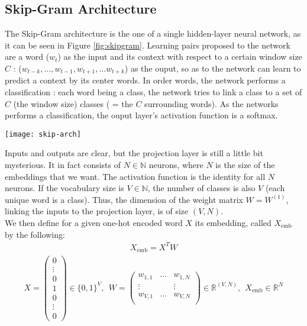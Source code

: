 \documentclass{article}
\newcommand{\N}{\mathbb N}
\newcommand{\R}{\mathbb R}
\begin{document}
\subsection{Skip-Gram Architecture}

The Skip-Gram architecture is the one of a single hidden-layer neural network, as it can be seen in Figure
\ref{fig:skipgram}. Learning pairs proposed to the network are a word ($w_t$) as the input and its context with respect
to a certain window size $C$ : ($w_{t-k}, ..., w_{t-1}, w_{t+1}, ... w_{t+k}$) as the ouput, so as to the network
can learn to predict a context by its center words. In order words, the network performs a classification :
each word being a class, the network tries to link a class to a set of $C$ (the window size) classes
( = the $C$ surrounding words). 
 As the networks performs a classification, 
 the ouput layer's activation function is a softmax.  


\begin{center}
    \label{fig:skipgram}
    \texttt{[image: skip-arch]}
\end{center}

Inputs and outputs are clear, but the projection layer is still a little bit mysterious. It in fact
consists of $N\in \N$ neurons, where $N$ is the size of the embeddings that we want. 
The activation function is the identity for all $N$ neurons. If the vocabulary size is $V\in \N$, 
the number of classes is also $V$ (each unique word is a class). Thus, the dimension of the weight 
matrix $W = W^{(1)}$, linking the inputs to the projection layer, is of size $(V, N)$. \\

We then define for a given one-hot encoded word $X$ its embedding, called $X_{\text{emb}}$ by the following:
\begin{align}
    X_{\text{emb}} = X^{T}  W 
    \label{eq:embeddinform}
\end{align}
\begin{align*}
    X  =
    \left (
    \begin{array}{c}
        0 \\
        \vdots \\
        0 \\
        1 \\
        0 \\
        \vdots \\
        0
    \end{array}
    \right ) \in \{ 0, 1\}^{V}
    , \ \
    W = \left (
    \begin{array}{ccc}
        w_{1,1} & \dots & w_{1, N} \\
        \vdots  &       & \vdots \\
        w_{V,1} & \dots & w_{V, N} \\ 
    \end{array}
    \right ) \in \R^{(V, N)}, \ \ 
    X_{\text{emb}} \in \R^{N}
\end{align*}
\end{document}
